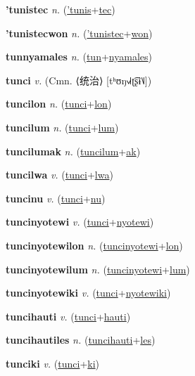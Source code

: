 \textbf{\hypertarget{'tunistec}{'tunistec}} \textit{n.} (\hyperlink{'tunis}{'tunis}+\allowbreak \hyperlink{tec}{tec})


\textbf{\hypertarget{'tunistecwon}{'tunistecwon}} \textit{n.} (\hyperlink{'tunistec}{'tunistec}+\allowbreak \hyperlink{won}{won})


\textbf{\hypertarget{tunnyamales}{tunnyamales}} \textit{n.} (\hyperlink{tun}{tun}+\allowbreak \hyperlink{nyamales}{nyamales})


\textbf{\hypertarget{tunci}{tunci}} \textit{v.} (Cmn. ⟨{\chinese{}统治}⟩ [tʰʊŋ˧˩˧ʈ͡ʂɨ˥˩])


\textbf{\hypertarget{tuncilon}{tuncilon}} \textit{n.} (\hyperlink{tunci}{tunci}+\allowbreak \hyperlink{lon}{lon})


\textbf{\hypertarget{tuncilum}{tuncilum}} \textit{n.} (\hyperlink{tunci}{tunci}+\allowbreak \hyperlink{lum}{lum})


\textbf{\hypertarget{tuncilumak}{tuncilumak}} \textit{n.} (\hyperlink{tuncilum}{tuncilum}+\allowbreak \hyperlink{ak}{ak})


\textbf{\hypertarget{tuncilwa}{tuncilwa}} \textit{v.} (\hyperlink{tunci}{tunci}+\allowbreak \hyperlink{lwa}{lwa})


\textbf{\hypertarget{tuncinu}{tuncinu}} \textit{v.} (\hyperlink{tunci}{tunci}+\allowbreak \hyperlink{nu}{nu})


\textbf{\hypertarget{tuncinyotewi}{tuncinyotewi}} \textit{v.} (\hyperlink{tunci}{tunci}+\allowbreak \hyperlink{nyotewi}{nyotewi})


\textbf{\hypertarget{tuncinyotewilon}{tuncinyotewilon}} \textit{n.} (\hyperlink{tuncinyotewi}{tuncinyotewi}+\allowbreak \hyperlink{lon}{lon})


\textbf{\hypertarget{tuncinyotewilum}{tuncinyotewilum}} \textit{n.} (\hyperlink{tuncinyotewi}{tuncinyotewi}+\allowbreak \hyperlink{lum}{lum})


\textbf{\hypertarget{tuncinyotewiki}{tuncinyotewiki}} \textit{v.} (\hyperlink{tunci}{tunci}+\allowbreak \hyperlink{nyotewiki}{nyotewiki})


\textbf{\hypertarget{tuncihauti}{tuncihauti}} \textit{v.} (\hyperlink{tunci}{tunci}+\allowbreak \hyperlink{hauti}{hauti})


\textbf{\hypertarget{tuncihautiles}{tuncihautiles}} \textit{n.} (\hyperlink{tuncihauti}{tuncihauti}+\allowbreak \hyperlink{les}{les})


\textbf{\hypertarget{tunciki}{tunciki}} \textit{v.} (\hyperlink{tunci}{tunci}+\allowbreak \hyperlink{ki}{ki})


